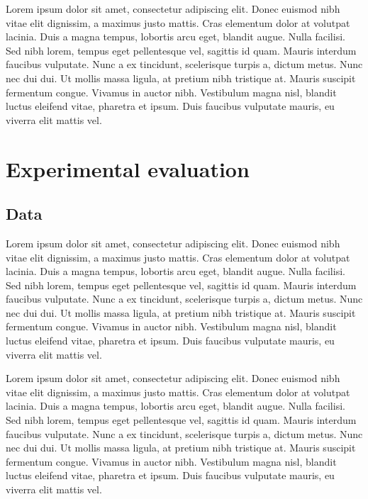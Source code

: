 \documentclass{article}
\begin{document}
Lorem ipsum dolor sit amet, consectetur adipiscing elit.
Donec euismod nibh vitae elit dignissim, a maximus justo mattis.
Cras elementum dolor at volutpat lacinia.
Duis a magna tempus, lobortis arcu eget, blandit augue.
Nulla facilisi.
Sed nibh lorem, tempus eget pellentesque vel, sagittis id quam.
Mauris interdum faucibus vulputate.
Nunc a ex tincidunt, scelerisque turpis a, dictum metus.
Nunc nec dui dui.
Ut mollis massa ligula, at pretium nibh tristique at.
Mauris suscipit fermentum congue.
Vivamus in auctor nibh.
Vestibulum magna nisl, blandit luctus eleifend vitae, pharetra et ipsum.
Duis faucibus vulputate mauris, eu viverra elit mattis vel.



\section{Experimental evaluation}



\subsection{Data}
Lorem ipsum dolor sit amet, consectetur adipiscing elit.
Donec euismod nibh vitae elit dignissim, a maximus justo mattis.
Cras elementum dolor at volutpat lacinia.
Duis a magna tempus, lobortis arcu eget, blandit augue.
Nulla facilisi.
Sed nibh lorem, tempus eget pellentesque vel, sagittis id quam.
Mauris interdum faucibus vulputate.
Nunc a ex tincidunt, scelerisque turpis a, dictum metus.
Nunc nec dui dui.
Ut mollis massa ligula, at pretium nibh tristique at.
Mauris suscipit fermentum congue.
Vivamus in auctor nibh.
Vestibulum magna nisl, blandit luctus eleifend vitae, pharetra et ipsum.
Duis faucibus vulputate mauris, eu viverra elit mattis vel.

Lorem ipsum dolor sit amet, consectetur adipiscing elit.
Donec euismod nibh vitae elit dignissim, a maximus justo mattis.
Cras elementum dolor at volutpat lacinia.
Duis a magna tempus, lobortis arcu eget, blandit augue.
Nulla facilisi.
Sed nibh lorem, tempus eget pellentesque vel, sagittis id quam.
Mauris interdum faucibus vulputate.
Nunc a ex tincidunt, scelerisque turpis a, dictum metus.
Nunc nec dui dui.
Ut mollis massa ligula, at pretium nibh tristique at.
Mauris suscipit fermentum congue.
Vivamus in auctor nibh.
Vestibulum magna nisl, blandit luctus eleifend vitae, pharetra et ipsum.
Duis faucibus vulputate mauris, eu viverra elit mattis vel.
\end{document}
